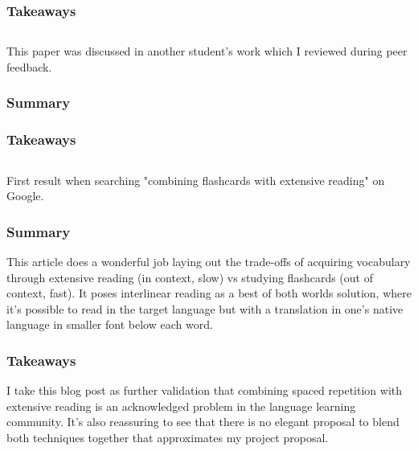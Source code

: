 \documentclass[
	letterpaper, %
]{jdf}
\begin{document}
\subsubsection{Takeaways}

\subsection{}
This paper was discussed in another student's work which I reviewed during peer feedback.

\subsubsection{Summary}


\subsubsection{Takeaways}


\subsection{}
First result when searching "combining flashcards with extensive reading" on Google.

\subsubsection{Summary}
This article does a wonderful job laying out the trade-offs of acquiring vocabulary through extensive reading (in context, slow) vs studying flashcards (out of context, fast). It poses interlinear reading as a best of both worlds solution, where it's possible to read in the target language but with a translation in one's native language in smaller font below each word.

\subsubsection{Takeaways}
I take this blog post as further validation that combining spaced repetition with extensive reading is an acknowledged problem in the language learning community. It's also reassuring to see that there is no elegant proposal to blend both techniques together that approximates my project proposal.
\end{document}
